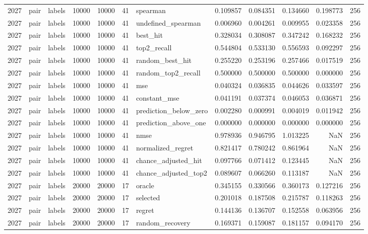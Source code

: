 \begin{tabular}{rllrrrlrrrrr}
2027 & pair & labels & 10000 & 10000 & 41 & spearman & 0.109857 & 0.084351 & 0.134660 & 0.198773 & 256 \\
2027 & pair & labels & 10000 & 10000 & 41 & undefined_spearman & 0.006960 & 0.004261 & 0.009955 & 0.023358 & 256 \\
2027 & pair & labels & 10000 & 10000 & 41 & best_hit & 0.328034 & 0.308087 & 0.347242 & 0.168232 & 256 \\
2027 & pair & labels & 10000 & 10000 & 41 & top2_recall & 0.544804 & 0.533130 & 0.556593 & 0.092297 & 256 \\
2027 & pair & labels & 10000 & 10000 & 41 & random_best_hit & 0.255220 & 0.253196 & 0.257466 & 0.017519 & 256 \\
2027 & pair & labels & 10000 & 10000 & 41 & random_top2_recall & 0.500000 & 0.500000 & 0.500000 & 0.000000 & 256 \\
2027 & pair & labels & 10000 & 10000 & 41 & mse & 0.040324 & 0.036835 & 0.044626 & 0.033597 & 256 \\
2027 & pair & labels & 10000 & 10000 & 41 & constant_mse & 0.041191 & 0.037374 & 0.046053 & 0.036871 & 256 \\
2027 & pair & labels & 10000 & 10000 & 41 & prediction_below_zero & 0.002280 & 0.000991 & 0.004019 & 0.011942 & 256 \\
2027 & pair & labels & 10000 & 10000 & 41 & prediction_above_one & 0.000000 & 0.000000 & 0.000000 & 0.000000 & 256 \\
2027 & pair & labels & 10000 & 10000 & 41 & nmse & 0.978936 & 0.946795 & 1.013225 & NaN & 256 \\
2027 & pair & labels & 10000 & 10000 & 41 & normalized_regret & 0.821417 & 0.780242 & 0.861964 & NaN & 256 \\
2027 & pair & labels & 10000 & 10000 & 41 & chance_adjusted_hit & 0.097766 & 0.071412 & 0.123445 & NaN & 256 \\
2027 & pair & labels & 10000 & 10000 & 41 & chance_adjusted_top2 & 0.089607 & 0.066260 & 0.113187 & NaN & 256 \\
2027 & pair & labels & 20000 & 20000 & 17 & oracle & 0.345155 & 0.330566 & 0.360173 & 0.127216 & 256 \\
2027 & pair & labels & 20000 & 20000 & 17 & selected & 0.201018 & 0.187508 & 0.215787 & 0.118263 & 256 \\
2027 & pair & labels & 20000 & 20000 & 17 & regret & 0.144136 & 0.136707 & 0.152558 & 0.063956 & 256 \\
2027 & pair & labels & 20000 & 20000 & 17 & random_recovery & 0.169371 & 0.159087 & 0.181157 & 0.094170 & 256 \\

\end{tabular}

